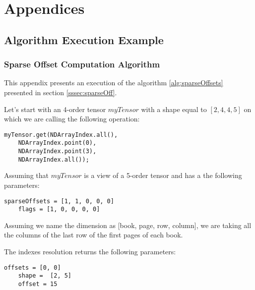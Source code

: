\appendix
\chapter{Appendices}
\section{Algorithm Execution Example}
\subsection{Sparse Offset Computation Algorithm}
\label{ch:spaoffexec}

	This appendix presents an execution of the algorithm \ref{alg:sparseOffsets} presented in section \ref{sssec:sparseOff}.
	
	Let's start with an 4-order tensor $myTensor$  with a shape equal to $[2, 4, 4, 5]$ on which we are calling the following operation:
	
	\begin{lstlisting}[style=nonumbers]
	myTensor.get(NDArrayIndex.all(),
	NDArrayIndex.point(0),
	NDArrayIndex.point(3),
	NDArrayIndex.all());
	\end{lstlisting}
	
	Assuming that $myTensor$ is a view of a 5-order tensor and has a the following parameters:
	
	\begin{lstlisting}[style=nonumbers]		
	sparseOffsets = [1, 1, 0, 0, 0]
	flags = [1, 0, 0, 0, 0]
	\end{lstlisting}
	
	Assuming we name the dimension as [book, page, row, column], we are taking all the columns of the last row of the first pages of each book.
	
	The indexes resolution returns the following parameters:
	
	\begin{lstlisting}[style=nonumbers]
	offsets = [0, 0]
	shape =  [2, 5]
	offset = 15
	\end{lstlisting}
	
